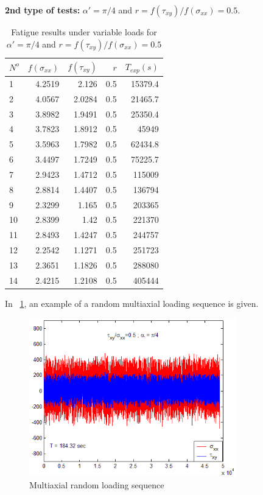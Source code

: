 \documentclass[3p,times,number,review]{elsarticle}
\newcommand{\figref}[1]{\figurename~\ref{#1}}
\begin{document}
\textbf{2nd type of tests:} $\alpha' = \pi / 4$ and $r =f(\tau_{xy})/f(\sigma_{xx})=0.5$.

\begin{table}[]
	\centering
	\begin{tabular}{lrrrr}
		\hline
		$N^o$ & $f(\sigma_{xx})$ & $f(\tau_{xy})$ & $r$   & $T_{exp}(s)$ \\ \hline
		1   & 4.2519                  & 2.126   & 0.5 & 15379.4    \\
		2   & 4.0567                  & 2.0284  & 0.5 & 21465.7    \\
		3   & 3.8982                  & 1.9491  & 0.5 & 25350.4    \\
		4   & 3.7823                  & 1.8912  & 0.5 & 45949      \\
		5   & 3.5963                  & 1.7982  & 0.5 & 62434.8    \\
		6   & 3.4497                  & 1.7249  & 0.5 & 75225.7    \\
		7   & 2.9423                  & 1.4712  & 0.5 & 115009     \\
		8   & 2.8814                  & 1.4407  & 0.5 & 136794     \\
		9   & 2.3299                  & 1.165   & 0.5 & 203365     \\
		10  & 2.8399                  & 1.42    & 0.5 & 221370     \\
		11  & 2.8493                  & 1.4247  & 0.5 & 244757     \\
		12  & 2.2542                  & 1.1271  & 0.5 & 251723     \\
		13  & 2.3651                  & 1.1826  & 0.5 & 288080     \\
		14  & 2.4215                  & 1.2108  & 0.5 & 405444     \\ \hline
	\end{tabular}
	\caption{Fatigue results under variable loads for $\alpha' = \pi / 4$ and $r =f(\tau_{xy})/f(\sigma_{xx})=0.5$}
	\label{tab.10HNAPrand2}
\end{table}

In \figref{fig.10HNAP2Drandom}, an example of a random multiaxial loading sequence is given.
\begin{figure}[!h]
	\centering
	\includegraphics[width=0.8\textwidth]{figures//10HNAP2Drandom.png} 
	\caption{Multiaxial random loading sequence}
	\label{fig.10HNAP2Drandom}
\end{figure}
\end{document}
